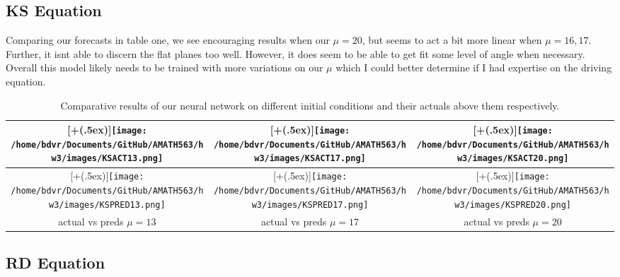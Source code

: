 \documentclass[12pt]{article}
\newcommand*{\addheight}[2][.5ex]{%
	\raisebox{0pt}[\dimexpr\height+(#1)\relax]{#2}%
}
\begin{document}
\subsection{KS Equation}
Comparing our forecasts in table one, we see encouraging results when our $\mu=20$, but seems to act a bit more linear when $\mu = 16,17$. Further, it isnt able to discern the flat planes too well. However, it does seem to be able to get fit some level of angle when necessary. Overall this model likely needs to be trained with more variations on our $\mu$ which I could better determine if I had expertise on the driving equation.
\begin{table}[H]
	\begin{center}
		\begin{tabular*}{0.98\linewidth}{|c|c|c|}
			\hline
			\addheight{\texttt{[image: /home/bdvr/Documents/GitHub/AMATH563/hw3/images/KSACT13.png]}} 
			&
			\addheight{\texttt{[image: /home/bdvr/Documents/GitHub/AMATH563/hw3/images/KSACT17.png]}}
			&
			\addheight{\texttt{[image: /home/bdvr/Documents/GitHub/AMATH563/hw3/images/KSACT20.png]}}
			\\
				\hline
			\addheight{\texttt{[image: /home/bdvr/Documents/GitHub/AMATH563/hw3/images/KSPRED13.png]}} 
			&
			\addheight{\texttt{[image: /home/bdvr/Documents/GitHub/AMATH563/hw3/images/KSPRED17.png]}}
			&
			\addheight{\texttt{[image: /home/bdvr/Documents/GitHub/AMATH563/hw3/images/KSPRED20.png]}}
			\\
			\small actual vs preds $\mu = 13$ &  			
			\small actual vs preds $\mu = 17$  &
			\small actual vs preds $\mu = 20$\\
			\hline
		\end{tabular*}
		\caption{Comparative results of our neural network on different initial conditions and their actuals above them respectively.}
	\end{center}
\end{table}
\vspace*{-\baselineskip}\vspace*{-\baselineskip}

\subsection{RD Equation}
\end{document}
